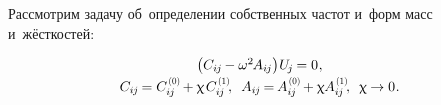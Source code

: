 \label{para:vibrations.smallperturbations}

\begin{otherlanguage}{russian}

Рассмотрим задачу об~определении собственных частот и~форм  масс и~жёсткостей:

\nopagebreak\vspace{-0.1em}\begin{equation}\begin{array}{c}
\bigl( C_{i\hspace{-0.1ex}j} \hspace{-0.15ex} - \omega^2 \hspace{-0.2ex} A_{i\hspace{-0.1ex}j} \bigr) \hspace{.1ex} U_{\hspace{-0.2ex}j} \hspace{-0.15ex} = 0 \hspace{.1ex} ,
\\[.2em]
%
C_{i\hspace{-0.1ex}j} \hspace{-0.2ex} = C_{i\hspace{-0.1ex}j}^{\hspace{.2ex}\scalebox{0.66}[0.66]{(0)}} \hspace{-0.2ex} + \smallparameter \hspace{.2ex} C_{i\hspace{-0.1ex}j}^{\hspace{.2ex}\scalebox{0.66}[0.66]{(1)}} \hspace{-0.4ex} ,
\;\:
A_{i\hspace{-0.1ex}j} \hspace{-0.2ex} = \hspace{-0.2ex} A_{i\hspace{-0.1ex}j}^{\hspace{.2ex}\scalebox{0.66}[0.66]{(0)}} \hspace{-0.2ex} + \smallparameter \hspace{-0.1ex} A_{i\hspace{-0.1ex}j}^{\hspace{.2ex}\scalebox{0.66}[0.66]{(1)}} \hspace{-0.4ex} ,
\;\:
\smallparameter \hspace{-0.12ex} \to 0 \hspace{.1ex} .
\end{array}\end{equation}


\end{otherlanguage}
